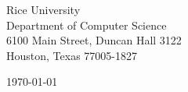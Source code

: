 \begin{minipage}{0.49\textwidth}
\begin{flushleft}
  \noindent
  Rice University\\
Department of Computer Science\\
6100 Main Street, Duncan Hall 3122\\
Houston, Texas 77005-1827  
\end{flushleft}
\end{minipage}
\begin{minipage}{0.47\textwidth}
\begin{flushright}
\today
\end{flushright}
\end{minipage} \\

\newcommand{\univ}{Rice University}
\newcommand{\univshort}{Rice}
\newcommand{\degree}{Ph.D.}
\newcommand{\dept}{Computer Science}



